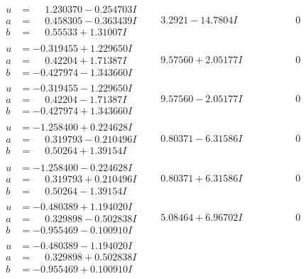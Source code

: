 \documentclass[1p]{elsarticle_modified}
\theoremstyle{definition}
\begin{document}
$$\begin{array}{c|c|c}
\begin{aligned}
u &= \phantom{-}1.230370 - 0.254703 I \\
a &= \phantom{-}0.458305 - 0.363439 I \\
b &= \phantom{-}0.55533 + 1.31007 I\end{aligned}
 & \phantom{-}3.2921 - 14.7804 I & \phantom{-0.000000 } 0 \\ \hline\begin{aligned}
u &= -0.319455 + 1.229650 I \\
a &= \phantom{-}0.42204 + 1.71387 I \\
b &= -0.427974 - 1.343660 I\end{aligned}
 & \phantom{-}9.57560 + 2.05177 I & \phantom{-0.000000 } 0 \\ \hline\begin{aligned}
u &= -0.319455 - 1.229650 I \\
a &= \phantom{-}0.42204 - 1.71387 I \\
b &= -0.427974 + 1.343660 I\end{aligned}
 & \phantom{-}9.57560 - 2.05177 I & \phantom{-0.000000 } 0 \\ \hline\begin{aligned}
u &= -1.258400 + 0.224628 I \\
a &= \phantom{-}0.319793 - 0.210496 I \\
b &= \phantom{-}0.50264 + 1.39154 I\end{aligned}
 & \phantom{-}0.80371 - 6.31586 I & \phantom{-0.000000 } 0 \\ \hline\begin{aligned}
u &= -1.258400 - 0.224628 I \\
a &= \phantom{-}0.319793 + 0.210496 I \\
b &= \phantom{-}0.50264 - 1.39154 I\end{aligned}
 & \phantom{-}0.80371 + 6.31586 I & \phantom{-0.000000 } 0 \\ \hline\begin{aligned}
u &= -0.480389 + 1.194020 I \\
a &= \phantom{-}0.329898 - 0.502838 I \\
b &= -0.955469 - 0.100910 I\end{aligned}
 & \phantom{-}5.08464 + 6.96702 I & \phantom{-0.000000 } 0 \\ \hline\begin{aligned}
u &= -0.480389 - 1.194020 I \\
a &= \phantom{-}0.329898 + 0.502838 I \\
b &= -0.955469 + 0.100910 I\end{aligned}

\end{array}$$
\end{document}
